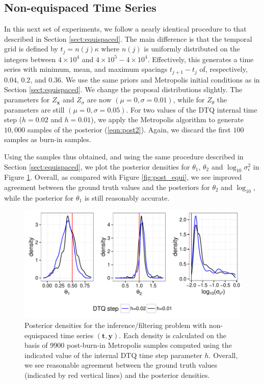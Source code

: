 \documentclass[wcp]{jmlr}
\begin{document}
\subsection{Non-equispaced Time Series}
\label{sect:nonequispaced}
In this next set of experiments, we follow a nearly identical
procedure to that described in Section \ref{sect:equispaced}.  The
main difference is that the temporal grid is defined by $t_j = n(j)
\kappa$ where $n(j)$ is uniformly distributed on the integers between
$4 \times 10^{4}$ and $4 \times 10^5 - 4 \times 10^4$.  Effectively,
this generates a time series with minimum, mean, and maximum spacings
$t_{j+1} - t_j$ of, respectively, $0.04$, $0.2$, and $0.36$.  We use the same priors and Metropolis initial conditions as in Section \ref{sect:equispaced}.  We change
the proposal distributions slightly.  The parameters for
$Z_{\mathbf{x}}$ and $Z_\sigma$ are now $(\mu=0,\sigma=0.01)$, while
for $Z_\theta$ the parameters are still $(\mu=0,\sigma=0.05)$.
For two values of the DTQ internal time step ($h = 0.02$ and
$h=0.01$), we apply the Metropolis algorithm to generate $10,000$
samples of the posterior (\ref{eqn:post2}).  Again, we discard the
first $100$ samples as burn-in samples.

Using the samples thus obtained, and using the same procedure
described in Section \ref{sect:equispaced}, we plot the posterior densities for
$\theta_1$, $\theta_2$ and $\log_{10} \sigma_\epsilon^2$ in Figure
\ref{fig:post_nonequi}.  Overall, as compared with Figure
\ref{fig:post_equi}, we see improved agreement between the ground
truth values and the posteriors for $\theta_2$ and
$\log_{10}$, while the posterior for $\theta_1$ is still reasonably
accurate.


\begin{figure}[th]
\begin{center}
\includegraphics[width=6in]{post_nonequi}
\end{center}
\vspace{-0.25in}
\caption{Posterior densities for the inference/filtering problem with
  non-equispaced time series $(\mathbf{t},\mathbf{y})$.  Each density is
  calculated on the basis of $9900$ post-burn-in Metropolis samples
  computed  using the indicated value of the internal DTQ time step
  parameter $h$.  Overall, we see reasonable agreement between the
  ground truth values (indicated by red vertical lines) and the
  posterior densities.}
\label{fig:post_nonequi}
\end{figure}
\end{document}
